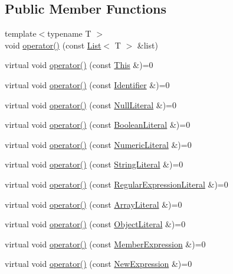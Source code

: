 \subsection*{Public Member Functions}
\begin{DoxyCompactItemize}
\item 
{\footnotesize template$<$typename T $>$ }\\void \hyperlink{struct_visitor_af54ab534ccb009ab5a129247bc38dd05}{operator()} (const \hyperlink{struct_list}{List}$<$ T $>$ \&list)
\item 
virtual void \hyperlink{struct_visitor_a7a043c9da4e7f8233db48afb82dbc7bc}{operator()} (const \hyperlink{struct_this}{This} \&)=0
\item 
virtual void \hyperlink{struct_visitor_a2d09687aa24b1b618c6205f8413c2dd3}{operator()} (const \hyperlink{struct_identifier}{Identifier} \&)=0
\item 
virtual void \hyperlink{struct_visitor_a2278ee24407bdc0d3addf887754d4c6c}{operator()} (const \hyperlink{struct_null_literal}{Null\+Literal} \&)=0
\item 
virtual void \hyperlink{struct_visitor_af3b394eaf1b9b1db22379aedcb234a2f}{operator()} (const \hyperlink{struct_boolean_literal}{Boolean\+Literal} \&)=0
\item 
virtual void \hyperlink{struct_visitor_a6d707fe0c1563b39aae3ecd7ddb5ab8f}{operator()} (const \hyperlink{struct_numeric_literal}{Numeric\+Literal} \&)=0
\item 
virtual void \hyperlink{struct_visitor_a6bab8ba66edf0cc73cb92073269e7848}{operator()} (const \hyperlink{struct_string_literal}{String\+Literal} \&)=0
\item 
virtual void \hyperlink{struct_visitor_aea90f9399628f301f8c25a62ce268097}{operator()} (const \hyperlink{struct_regular_expression_literal}{Regular\+Expression\+Literal} \&)=0
\item 
virtual void \hyperlink{struct_visitor_a46f9846468f2c12ddc585cfe0421e6f0}{operator()} (const \hyperlink{struct_array_literal}{Array\+Literal} \&)=0
\item 
virtual void \hyperlink{struct_visitor_ad85d9aa9718801a1a8233cf51d8f7055}{operator()} (const \hyperlink{struct_object_literal}{Object\+Literal} \&)=0
\item 
virtual void \hyperlink{struct_visitor_a175fd29619240cc378703de4c357f348}{operator()} (const \hyperlink{struct_member_expression}{Member\+Expression} \&)=0
\item 
virtual void \hyperlink{struct_visitor_a13ead8d5ef82f284e301ba8127e9fb56}{operator()} (const \hyperlink{struct_new_expression}{New\+Expression} \&)=0

\end{DoxyCompactItemize}
